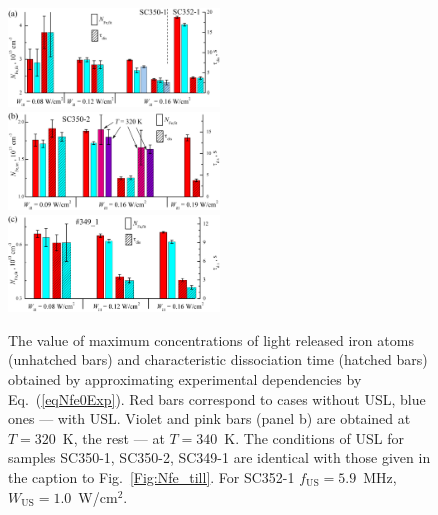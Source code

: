 \documentclass[%
 aip,jap,
 amsmath,amssymb,
 reprint,%
]{revtex4-1}
\begin{document}
\begin{figure}
\includegraphics[width=0.5\textwidth]{Fig5a}\\%
\includegraphics[width=0.5\textwidth]{Fig5b}\\%
\includegraphics[width=0.5\textwidth]{Fig5c}%
\caption{\label{Fig:IllRez}
The value of maximum concentrations of light released iron atoms (unhatched bars)
and characteristic dissociation time (hatched bars) obtained by approximating experimental dependencies by Eq.~(\ref{eqNfe0Exp}).
Red bars correspond to cases without USL,
blue ones --- with USL.
Violet and pink bars (panel b) are obtained at $T=320$~K,
the rest --- at $T=340$~K.
The conditions of USL for samples SC350-1, SC350-2,
SC349-1 are identical with those given in the caption to Fig.~\ref{Fig:Nfe_till}.
For SC352-1 $f_\mathrm{US}=5.9$~MHz,
$W_\mathrm{US}=1.0$~W/cm$^2$.
}
\end{figure}
\end{document}
